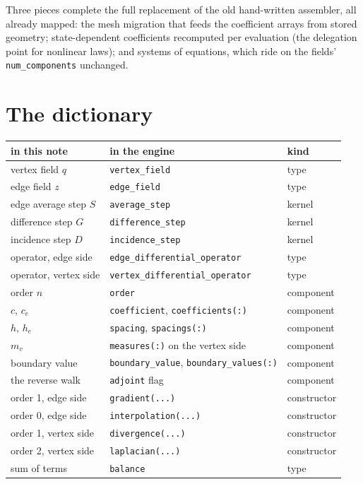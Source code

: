 \documentclass[11pt]{article}
\begin{document}
Three pieces complete the full replacement of the old hand-written
assembler, all already mapped: the mesh migration that feeds the
coefficient arrays from stored geometry; state-dependent coefficients
recomputed per evaluation (the delegation point for nonlinear laws);
and systems of equations, which ride on the fields'
\texttt{num\_components} unchanged.

\section{The dictionary}\label{sec:dictionary}

\begin{center}
\begin{tabular}{@{}lll@{}}
\toprule
in this note & in the engine & kind \\
\midrule
vertex field $q$      & \texttt{vertex\_field}                & type \\
edge field $z$        & \texttt{edge\_field}                  & type \\
edge average step $S$ & \texttt{average\_step}                & kernel \\
difference step $G$   & \texttt{difference\_step}             & kernel \\
incidence step $D$    & \texttt{incidence\_step}              & kernel \\
operator, edge side   & \texttt{edge\_differential\_operator} & type \\
operator, vertex side & \texttt{vertex\_differential\_operator} & type \\
order $n$             & \texttt{order}                        & component \\
$c$, $c_e$            & \texttt{coefficient}, \texttt{coefficients(:)} & component \\
$h$, $h_e$            & \texttt{spacing}, \texttt{spacings(:)} & component \\
$m_v$                 & \texttt{measures(:)} on the vertex side & component \\
boundary value        & \texttt{boundary\_value}, \texttt{boundary\_values(:)} & component \\
the reverse walk      & \texttt{adjoint} flag                 & component \\
order 1, edge side    & \texttt{gradient(...)}                & constructor \\
order 0, edge side    & \texttt{interpolation(...)}           & constructor \\
order 1, vertex side  & \texttt{divergence(...)}              & constructor \\
order 2, vertex side  & \texttt{laplacian(...)}               & constructor \\
sum of terms          & \texttt{balance}                      & type \\
\bottomrule
\end{tabular}
\end{center}
\end{document}
